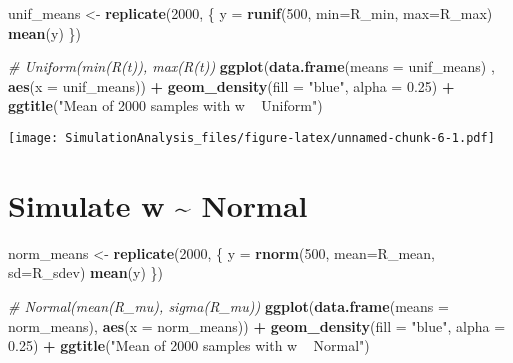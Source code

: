 \documentclass[
]{article}
\newenvironment{Shaded}{\begin{snugshade}}{\end{snugshade}}
\newcommand{\CommentTok}[1]{\textcolor[rgb]{0.56,0.35,0.01}{\textit{#1}}}
\newcommand{\DataTypeTok}[1]{\textcolor[rgb]{0.13,0.29,0.53}{#1}}
\newcommand{\DecValTok}[1]{\textcolor[rgb]{0.00,0.00,0.81}{#1}}
\newcommand{\FloatTok}[1]{\textcolor[rgb]{0.00,0.00,0.81}{#1}}
\newcommand{\KeywordTok}[1]{\textcolor[rgb]{0.13,0.29,0.53}{\textbf{#1}}}
\newcommand{\NormalTok}[1]{#1}
\newcommand{\OperatorTok}[1]{\textcolor[rgb]{0.81,0.36,0.00}{\textbf{#1}}}
\newcommand{\StringTok}[1]{\textcolor[rgb]{0.31,0.60,0.02}{#1}}
\begin{document}
\begin{Shaded}
\begin{Highlighting}[]
\NormalTok{unif_means <-}\StringTok{ }\KeywordTok{replicate}\NormalTok{(}\DecValTok{2000}\NormalTok{, \{}
\NormalTok{  y =}\StringTok{ }\KeywordTok{runif}\NormalTok{(}\DecValTok{500}\NormalTok{, }\DataTypeTok{min=}\NormalTok{R_min, }\DataTypeTok{max=}\NormalTok{R_max)}
  \KeywordTok{mean}\NormalTok{(y)}
\NormalTok{\})}

\CommentTok{# Uniform(min(R(t)), max(R(t))}
\KeywordTok{ggplot}\NormalTok{(}\KeywordTok{data.frame}\NormalTok{(}\DataTypeTok{means =}\NormalTok{ unif_means) , }\KeywordTok{aes}\NormalTok{(}\DataTypeTok{x =}\NormalTok{ unif_means)) }\OperatorTok{+}\StringTok{ }\KeywordTok{geom_density}\NormalTok{(}\DataTypeTok{fill =} \StringTok{"blue"}\NormalTok{, }\DataTypeTok{alpha =} \FloatTok{0.25}\NormalTok{) }\OperatorTok{+}\StringTok{ }\KeywordTok{ggtitle}\NormalTok{(}\StringTok{"Mean of 2000 samples with w ~ Uniform"}\NormalTok{)}
\end{Highlighting}
\end{Shaded}

\texttt{[image: SimulationAnalysis\_files/figure-latex/unnamed-chunk-6-1.pdf]}

\hypertarget{simulate-w-normal}{%
\section{Simulate w \textasciitilde{} Normal}\label{simulate-w-normal}}

\begin{Shaded}
\begin{Highlighting}[]
\NormalTok{norm_means <-}\StringTok{ }\KeywordTok{replicate}\NormalTok{(}\DecValTok{2000}\NormalTok{, \{}
\NormalTok{  y =}\StringTok{ }\KeywordTok{rnorm}\NormalTok{(}\DecValTok{500}\NormalTok{, }\DataTypeTok{mean=}\NormalTok{R_mean, }\DataTypeTok{sd=}\NormalTok{R_sdev)}
  \KeywordTok{mean}\NormalTok{(y)}
\NormalTok{\})}

\CommentTok{# Normal(mean(R_mu), sigma(R_mu))}
\KeywordTok{ggplot}\NormalTok{(}\KeywordTok{data.frame}\NormalTok{(}\DataTypeTok{means =}\NormalTok{ norm_means), }\KeywordTok{aes}\NormalTok{(}\DataTypeTok{x =}\NormalTok{ norm_means)) }\OperatorTok{+}\StringTok{ }\KeywordTok{geom_density}\NormalTok{(}\DataTypeTok{fill =} \StringTok{"blue"}\NormalTok{, }\DataTypeTok{alpha =} \FloatTok{0.25}\NormalTok{) }\OperatorTok{+}\StringTok{ }\KeywordTok{ggtitle}\NormalTok{(}\StringTok{"Mean of 2000 samples with w ~ Normal"}\NormalTok{)}
\end{Highlighting}
\end{Shaded}
\end{document}
